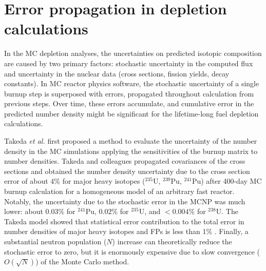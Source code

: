 \chapter{Error propagation in depletion calculations}
In the \gls{MC} depletion analyses, the uncertainties on predicted isotopic 
composition are caused by two primary factors: stochastic uncertainty in 
the computed flux and uncertainty in the nuclear data (cross sections, fission 
yields, decay constants). In \gls{MC} reactor physics software, the stochastic 
uncertainty of a single burnup step is superposed with errors, propagated 
throughout calculation from previous steps. Over time, these errors 
accumulate, and cumulative error in the predicted number density might be 
significant for the lifetime-long fuel depletion calculations.

Takeda \emph{et al.} first proposed a method to evaluate the uncertainty of 
the number density in the \gls{MC} simulations applying the sensitivities of 
the burnup matrix to number densities. Takeda and colleagues propagated 
covariances of the cross sections and obtained the number density uncertainty 
due to the cross section error of about 4\% for major heavy isotopes 
($^{235}$U, $^{239}$Pu, $^{241}$Pu) after 400-day \gls{MC} burnup calculation 
for a homogeneous model of an arbitrary fast reactor. 
Notably, the uncertainty due to the stochastic error in the MCNP 
was much lower: about 0.03\% for $^{241}$Pu, 0.02\% for $^{235}$U, and 
$<0.004$\% for $^{238}$U. The Takeda model showed that statistical error 
contribution to the total error in number densities of major heavy isotopes 
and \glspl{FP} is less than 1\% \cite{takeda_estimation_1999}. Finally, 
a substantial neutron population ($N$) increase can theoretically reduce the 
stochastic error to zero, but it is enormously expensive due to slow 
convergence ($O(\sqrt{N})$) of the Monte Carlo method.

